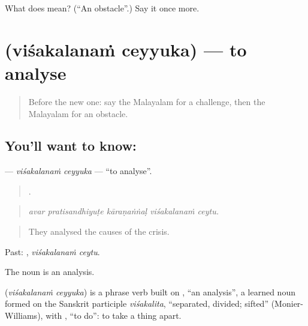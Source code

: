\begin{tcolorbox}[breakable,colback=teal!4,colframe=teal!35!black,title={Before you move on}]
What does  mean? (\textquotedblleft{}An obstacle\textquotedblright{}.) Say it once more.
\end{tcolorbox}
\section[\texorpdfstring{\ml{വിശകലനം} \ml{ചെയ്യുക} (viśakalanaṁ ceyyuka)}{വിശകലനം ചെയ്യുക (viśakalanaṁ ceyyuka)}]{  (viśakalanaṁ ceyyuka) — to analyse}

\label{lesson:ML-C448-visakalanam-ceyyuka}



\begin{quote}
Before the new one: say the Malayalam for a challenge, then the Malayalam for an obstacle.
\end{quote}

\subsection*{You'll want to know:  }
\textbf{ } — \emph{viśakalanaṁ ceyyuka} — \textquotedblleft{}to analyse\textquotedblright{}.

\begin{quote}
    .
\end{quote}

\begin{quote}
\emph{avar pratisandhiyuṭe kāraṇaṅṅaḷ viśakalanaṁ ceytu.}
\end{quote}

\begin{quote}
They analysed the causes of the crisis.
\end{quote}

Past:  , \emph{viśakalanaṁ ceytu}.

The noun  is an analysis.

\begin{cousinweb}
\textbf{ } (\emph{viśakalanaṁ ceyyuka}) is a phrase verb built on , \textquotedblleft{}an analysis\textquotedblright{}, a learned noun formed on the Sanskrit participle \emph{viśakalita}, \textquotedblleft{}separated, divided; sifted\textquotedblright{} (Monier-Williams), with , \textquotedblleft{}to do\textquotedblright{}: to take a thing apart.
\end{cousinweb}

